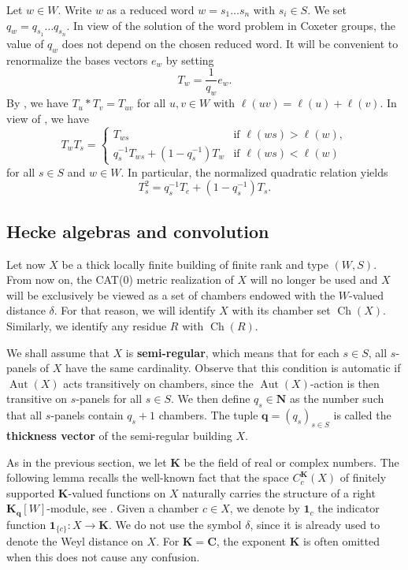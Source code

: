 \documentclass[12pt,a4paper]{amsproc}
\theoremstyle{definition}
\DeclareMathOperator{\Aut}{Aut}
\DeclareMathOperator{\Ch}{Ch}
\newcommand{\CC}{\mathbf C}
\newcommand{\KK}{\mathbf K}
\newcommand{\one}{\mathbf 1}
\begin{document}
 
Let $w \in W$. Write $w$ as a reduced word $w = s_1 \dots s_n$ with $s_i \in S$. We set $q_w = q_{s_1} \dots q_{s_n}$. In view of the solution of the word problem in Coxeter groups, the value of $q_w$ does not depend on the chosen reduced word. It will be convenient to renormalize the bases vectors $e_w$ by setting 
$$T_w = \frac 1 {q_w} e_w.$$
 By \cite[Lemma~19.1.2]{Davis}, we have  $T_u*T_v=T_{uv}$ for all $u, v \in W$ with  $\ell(uv)=\ell(u)+\ell(v)$.  
  In view of \cite[Proposition~19.1.1 and Lemma~19.1.5]{Davis}, we have
\begin{equation}\label{eq:Hecke}
T_w T_s= \left\{
\begin{array}{ll}
T_{ws} & \text{if } \ell(ws) > \ell(w),\\
q_s^{-1} T_{ws} + (1-q_s^{-1}) T_w & \text{if } \ell(ws) < \ell(w)
\end{array}
\right.
\end{equation}
for all $s \in S$ and $w \in W$. In particular, the normalized quadratic relation yields
\begin{equation*}
        T_s^2=q_s^{-1}T_e+(1-q_s^{-1})T_s.
\end{equation*}


\subsection{Hecke algebras and convolution}\label{sec:Hecke-convol}

Let now $X$ be a thick locally finite building of finite rank and type $(W,S)$. From now on, the CAT($0$) metric realization of $X$ will no longer be used and $X$ will be exclusively be viewed as a set of chambers endowed with the $W$-valued  distance $\delta$. For that reason, we will identify $X$ with its chamber set $\Ch(X)$. Similarly, we identify any residue $R$ with $\Ch(R)$. 

We shall assume that $X$ is \textbf{semi-regular}, which means that for each $s \in S$, all $s$-panels of $X$ have the same cardinality. Observe that this condition is automatic if $\Aut(X)$ acts transitively on chambers, since the $\Aut(X)$-action is then transitive on $s$-panels for all $s \in S$.  We   then define $q_s \in \mathbf N$ as the number such that all $s$-panels contain $q_s+1$ chambers. The tuple  $\mathbf q = (q_s)_{s \in S}$ is called the \textbf{thickness vector} of the semi-regular building $X$. 

As in the previous section, we let $\KK$ be the field of real or complex numbers. 
The following lemma recalls the well-known fact that the space $C^\KK_c(X)$ of finitely supported $\KK$-valued functions on $X$ naturally carries the structure of a right  $\KK_{\mathbf q}[W]$-module, see    \cite{Parkinson}. Given a chamber $c \in X$, we denote by $\one_c$ the indicator function $\one_{\{c\}} \colon X \to \KK$. We do not use the symbol $\delta$, since it is already used to denote the Weyl distance on $X$. 
For $\KK = \CC$, the exponent $\KK$ is often omitted when this does not cause any confusion. 
\end{document}
